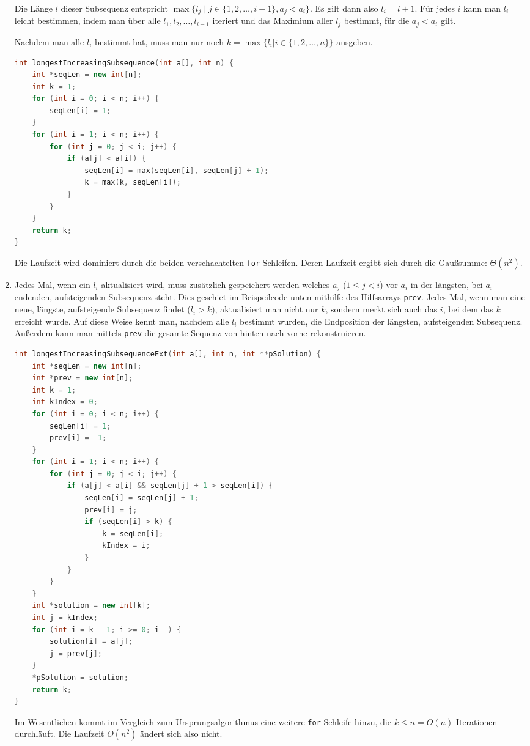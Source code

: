\documentclass[11pt,a4paper]{article}
\begin{document}
\begin{loesung}
\begin{enumerate}
        Die Länge $l$ dieser Subsequenz entspricht $\max\{l_j \mid j \in \{1, 2, \ldots, i - 1\}, a_j < a_i\}$.
        Es gilt dann also $l_i = l + 1$.
        Für jedes $i$ kann man $l_i$ leicht bestimmen, indem man über alle $l_1, l_2, \ldots, l_{i - 1}$ iteriert und das Maximium aller $l_j$ bestimmt, für die $a_j < a_i$ gilt.
        
        Nachdem man alle $l_i$ bestimmt hat, muss man nur noch $k = \max\{l_i | i \in \{1, 2, \ldots, n\}\}$ ausgeben.
        \begin{lstlisting}[language=c++]
int longestIncreasingSubsequence(int a[], int n) {
    int *seqLen = new int[n];
    int k = 1;
    for (int i = 0; i < n; i++) {
        seqLen[i] = 1;
    }
    for (int i = 1; i < n; i++) {
        for (int j = 0; j < i; j++) {
            if (a[j] < a[i]) {
                seqLen[i] = max(seqLen[i], seqLen[j] + 1);
                k = max(k, seqLen[i]);
            }
        }
    }
    return k;
} 
        \end{lstlisting}
        Die Laufzeit wird dominiert durch die beiden verschachtelten \texttt{for}-Schleifen.
        Deren Laufzeit ergibt sich durch die Gaußsumme: $\Theta(n^2)$.
        \item Jedes Mal, wenn ein $l_i$ aktualisiert wird, muss zusätzlich gespeichert werden welches $a_j$ ($1 \leq j < i$) vor $a_i$ in der längsten, bei $a_i$ endenden, aufsteigenden Subsequenz steht.
        Dies geschiet im Beispeilcode unten mithilfe des Hilfsarrays \texttt{prev}.
        Jedes Mal, wenn man eine neue, längste, aufsteigende Subsequenz findet ($l_i > k$), aktualisiert man nicht nur $k$, sondern merkt sich auch das $i$, bei dem das $k$ erreicht wurde.
        Auf diese Weise kennt man, nachdem alle $l_i$ bestimmt wurden, die Endposition der längsten, aufsteigenden Subsequenz.
        Außerdem kann man mittels \texttt{prev} die gesamte Sequenz von hinten nach vorne rekonstruieren.
        \begin{lstlisting}[language=c++]
int longestIncreasingSubsequenceExt(int a[], int n, int **pSolution) {
    int *seqLen = new int[n];
    int *prev = new int[n];
    int k = 1;
    int kIndex = 0;
    for (int i = 0; i < n; i++) {
        seqLen[i] = 1;
        prev[i] = -1;
    }
    for (int i = 1; i < n; i++) {
        for (int j = 0; j < i; j++) {
            if (a[j] < a[i] && seqLen[j] + 1 > seqLen[i]) {
                seqLen[i] = seqLen[j] + 1;
                prev[i] = j;
                if (seqLen[i] > k) {
                    k = seqLen[i];
                    kIndex = i;
                }
            }
        }
    }
    int *solution = new int[k];
    int j = kIndex;
    for (int i = k - 1; i >= 0; i--) {
        solution[i] = a[j];
        j = prev[j];
    }
    *pSolution = solution;
    return k;
}
        \end{lstlisting}
        Im Wesentlichen kommt im Vergleich zum Ursprungsalgorithmus eine weitere \texttt{for}-Schleife hinzu, die $k \leq n = O(n)$ Iterationen durchläuft.
        Die Laufzeit $O(n^2)$ ändert sich also nicht.


\end{enumerate}
\end{loesung}
\end{document}
